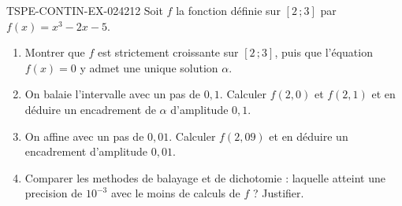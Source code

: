 \begin{exercice}{TSPE-CONTIN-EX-024}{2}{12}
Soit $f$ la fonction définie sur $[2\,;3]$ par $f(x) = x^3 - 2x - 5$.
\begin{enumerate}
  \item Montrer que $f$ est strictement croissante sur $[2\,;3]$, puis que l'équation $f(x) = 0$ y admet une unique solution $\alpha$.
  \item On balaie l'intervalle avec un pas de $0{,}1$. Calculer $f(2{,}0)$ et $f(2{,}1)$ et en déduire un encadrement de $\alpha$ d'amplitude $0{,}1$.
  \item On affine avec un pas de $0{,}01$. Calculer $f(2{,}09)$ et en déduire un encadrement d'amplitude $0{,}01$.
  \item Comparer les methodes de balayage et de dichotomie : laquelle atteint une precision de $10^{-3}$ avec le moins de calculs de $f$ ? Justifier.
\end{enumerate}
\end{exercice}
